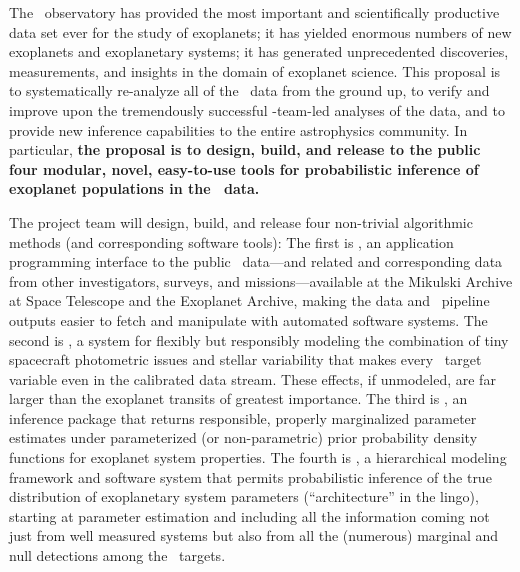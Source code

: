\documentclass[letterpaper,12pt]{article}
\newcommand{\kplr}{\package{kplr}}
\newcommand{\Untrendy}{\package{Untrendy}}
\newcommand{\Bart}{\package{Bart}}
\newcommand{\TheCreator}{\package{TheCreator}}
\begin{document}
The \Kepler\ observatory has provided the most important and
scientifically productive data set ever for the study of exoplanets;
it has yielded enormous numbers of new exoplanets and exoplanetary
systems; it has generated unprecedented discoveries, measurements, and
insights in the domain of exoplanet science.  This proposal is to
systematically re-analyze all of the \Kepler\ data from the ground up,
to verify and improve upon the tremendously successful
\Kepler-team-led analyses of the data, and to provide new inference
capabilities to the entire astrophysics community.  In particular,
\textbf{the proposal is to design, build, and release to the public
  four modular, novel, easy-to-use tools for probabilistic inference
  of exoplanet populations in the \Kepler\ data.}

The project team will design, build, and release four non-trivial
algorithmic methods (and corresponding software tools): The first is
\kplr, an application programming interface to the public
\Kepler\ data---and related and corresponding data from other
investigators, surveys, and missions---available at the Mikulski
Archive at Space Telescope and the Exoplanet Archive, making the data
and \Kepler\ pipeline outputs easier to fetch and manipulate with
automated software systems.  The second is \Untrendy, a system for
flexibly but responsibly modeling the combination of tiny spacecraft
photometric issues and stellar variability that makes every
\Kepler\ target variable even in the calibrated data stream.  These
effects, if unmodeled, are far larger than the exoplanet transits of
greatest importance.  The third is \Bart, an inference package that
returns responsible, properly marginalized parameter estimates under
parameterized (or non-parametric) prior probability density functions
for exoplanet system properties.  The fourth is \TheCreator, a
hierarchical modeling framework and software system that permits
probabilistic inference of the true distribution of exoplanetary
system parameters (``architecture'' in the lingo), starting at
parameter estimation and including all the information coming not just
from well measured systems but also from all the (numerous) marginal
and null detections among the \Kepler\ targets.
\end{document}
